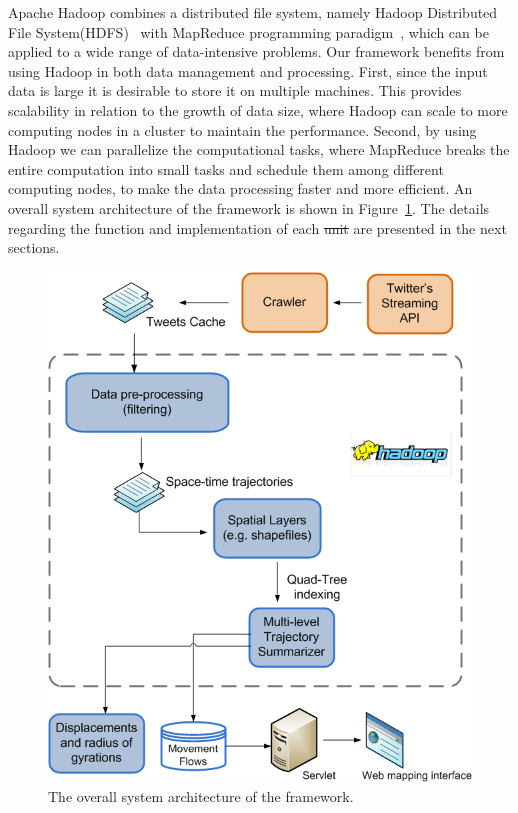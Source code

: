 \documentclass[ijgi,article,accept,moreauthors,pdftex,10pt,a4paper]{mdpi}
\theoremstyle{mdpi}
\newcounter{ex}
\newcounter{re}
\theoremstyle{mdpidefinition}
\providecommand{\DIFadd}[1]{{\protect\color{blue}\uwave{#1}}} %
\providecommand{\DIFdel}[1]{{\protect\color{red}\sout{#1}}}                      %
\providecommand{\DIFaddbegin}{} %
\providecommand{\DIFaddend}{} %
\providecommand{\DIFdelbegin}{} %
\providecommand{\DIFdelend}{} %
\begin{document}
Apache Hadoop combines a distributed file system, namely Hadoop Distributed File System(HDFS)~\cite{shvachko2010hadoop} with MapReduce programming paradigm~\cite{dean2008mapreduce}, which can be applied to a wide range of data-intensive problems.
Our framework benefits from using Hadoop in both data management and processing.
First, since the input data is large it is desirable to store it on multiple machines.
This provides scalability in relation to the growth of data size, where Hadoop can scale to more computing nodes in a cluster to maintain the performance.
Second, by using Hadoop we can parallelize the computational tasks, where MapReduce breaks the entire computation into small tasks and schedule them among different computing nodes, to make the data processing faster and more efficient.
An overall system architecture of the framework is shown in Figure~\ref{fig:overall_archi}.
The details regarding the function and implementation of each \DIFdelbegin \DIFdel{unit }\DIFdelend \DIFaddbegin \DIFadd{component }\DIFaddend are presented in the next sections.

\begin{figure}[ht]
\centering
\includegraphics[width=0.55\linewidth]{./figures/Overall_Architecture222}
\caption{The overall system architecture of the framework.}
\label{fig:overall_archi}
\end{figure}
\FloatBarrier
\end{document}
